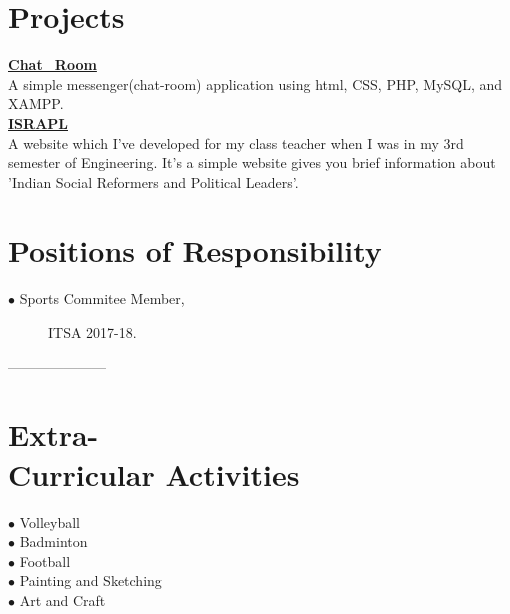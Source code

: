 \documentclass[margin,line]{res}
\newenvironment{list2}{
  \begin{list}{$\bullet$}{%
      \setlength{\itemsep}{0in}
      \setlength{\parsep}{0in} \setlength{\parskip}{0in}
      \setlength{\topsep}{0in} \setlength{\partopsep}{0in}
      \setlength{\leftmargin}{0.2in}}}{\end{list}}
\begin{document}
\begin{resume}
\section{\sc Projects}
\href{https://github.com/PurveshMakode24/Chat_Room}{\bf Chat\_Room}\\
A simple messenger(chat-room) application using html, CSS, PHP, MySQL, and XAMPP.\\

\href{https://github.com/PurveshMakode24/ISRAPL}{\bf ISRAPL}\\
A website which I've developed for my class teacher when I was in my 3rd semester of Engineering. It's a simple website gives you brief information about 'Indian Social Reformers and Political Leaders'.\\


\section{\sc Positions of Responsibility}
 
 \begin{description}
  \item[$\bullet$ Sports Commitee Member,]  ITSA 2017-18.
 
\end{description}

---------------------

\section{\sc Extra-\\Curricular Activities}
  \begin{description}
   \item[$\bullet$ Volleyball]
   \item[$\bullet$ Badminton]
   \item[$\bullet$ Football]
   \item[$\bullet$ Painting and Sketching]
   \item[$\bullet$ Art and Craft]
\end{description}



\iffalse
\section{\sc Publications}

\begin{list2}
\item LastName Author1, First initial., LastName Author2, First initial.,  "Title",{\em Where published}, Date
\item LastName Author1, First initial., LastName Author2, First initial.,  "Title",{\em Where published}, Date
\end{list2}


\section{\sc References }
Available upon request.
\fi
\end{resume}
\end{document}
